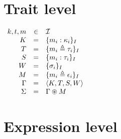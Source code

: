 \documentclass{article}[11pt]
\begin{document}
    \section{Trait level}\label{sec:trait-level}

    \begin{math}
        \begin{array}{rclp{5cm}}
            k, t, m & \in & {\cal I}                          \\
            K       & =   & \{ m_i : \kappa_i \}_I            \\
            T       & =   & \{ m_i \triangleq \tau_i \}_I     \\
            S       & =   & \{ m_i : \tau_i \}_I              \\
            W       & =   & \{ \sigma_i \}_I                  \\
            M       & =   & \{ m_i \triangleq \epsilon_i \}_I \\
            \Gamma  & =   & \langle K, T, S, W \rangle        \\
            \Sigma  & =   & \Gamma \circledast M
        \end{array}
    \end{math}


    \section{Expression level}\label{sec:expression-level}
\end{document}
